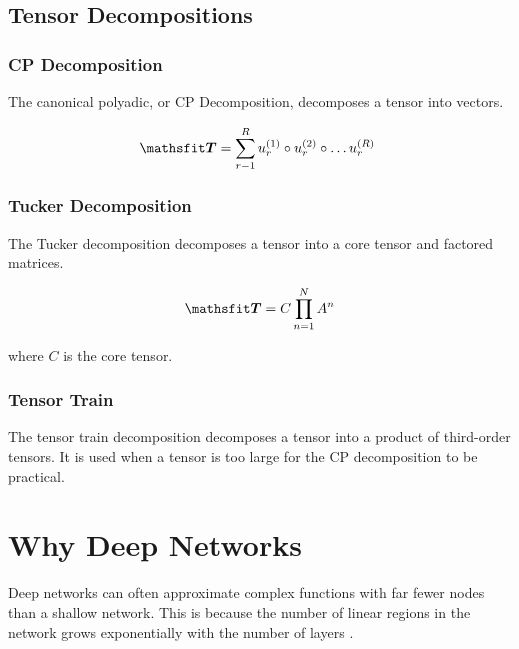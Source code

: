 \documentclass{article}
\begin{document}
\subsection{Tensor Decompositions}


\subsubsection{CP Decomposition}

The canonical polyadic, or CP Decomposition, decomposes a tensor into vectors.

\begin{equation}
    \tT = \sum_{r-1}^R u_r^{(1)} \circ  u_r^{(2)} \circ \dots  u_r^{(R)}\
    \label{CP}
\end{equation} %


\subsubsection{Tucker Decomposition}

The Tucker decomposition decomposes a tensor into a core tensor and factored matrices. %

\begin{equation}
    \tT = C\prod_{n=1}^N A^n
    \label{Tucker}
\end{equation} %

where \(C\) is the core tensor.


\subsubsection{Tensor Train}

The tensor train decomposition decomposes a tensor into a product of third-order tensors. It is used when a tensor is too large for the CP decomposition to be practical. 



\section{Why Deep Networks} %

Deep networks can often approximate complex functions with far fewer nodes than a shallow network. This is because the number of linear regions in the network grows exponentially with the number of layers \cite{montufar2014}.
\end{document}
